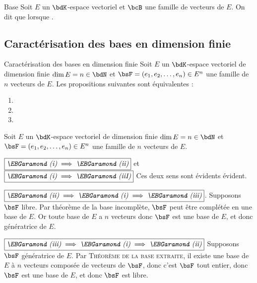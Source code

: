 \documentclass[a4paper,french,bookmarks]{article}
\begin{document}
\begin{definition}{Base}{}
    Soit $E$ un $\bdK$-espace vectoriel et $\bcB$ une famille de vecteurs de $E$. On dit que  lorsque .
\end{definition}

\newpage

\subsection{Caractérisation des baes en dimension finie}

\begin{theorem}{Caractérisation des bases en dimension finie}{}
    Soit $E$ un $\bdK$-espace vectoriel de dimension finie $\dim E = n \in \bdN$ et $\bsF = (e_1, e_2, \dots, e_n) \in E^n$ une famille de $n$ vecteurs de $E$. Les propositions suivantes sont équivalentes :
    \begin{enumerate}[label=\textit{\EBGaramond (\roman*)}]
        \item {}
        
        \item {}
        
        \item {}
    \end{enumerate}
\end{theorem}

\begin{nproof}
    Soit $E$ un $\bdK$-espace vectoriel de dimension finie $\dim E = n \in \bdN$ et $\bsF = (e_1, e_2, \dots, e_n) \in E^n$ une famille de $n$ vecteurs de $E$.
    
    \begin{enumerate}
        \itt $\boxed{\textit{\EBGaramond (i)} \implies \textit{\EBGaramond (ii)}}$ et $\boxed{\textit{\EBGaramond (i)} \implies \textit{\EBGaramond (iiI)}}$ Ces deux sens sont évidents évident.
        
        \itt $\boxed{\textit{\EBGaramond (ii)} \implies \textit{\EBGaramond (i)} \implies \textit{\EBGaramond (iii)}}$. Supposons $\bsF$ libre. Par théorème de la base incomplète, $\bsF$ peut être complétée en une base de $E$. Or toute base de $E$ a $n$ vecteurs donc $\bsF$ est une base de $E$, et donc génératrice de $E$.
        
        \itt $\boxed{\textit{\EBGaramond (iii)} \implies \textit{\EBGaramond (i)} \implies \textit{\EBGaramond (ii)}}$ Supposons $\bsF$ génératrice de $E$. Par \textsc{Théorème de la base extraite}, il existe une base de $E$ à $n$ vecteurs composée de vecteurs de $\bsF$, donc c'est $\bsF$ tout entier, donc $\bsF$ est une base de $E$, et donc $\bsF$ est libre.
    \end{enumerate}
\end{nproof}
\end{document}
